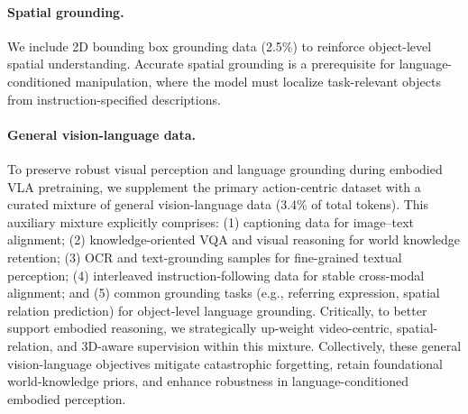 \paragraph{Spatial grounding.}
We include 2D bounding box grounding data (2.5\%) to reinforce object-level
spatial understanding. Accurate spatial grounding is a prerequisite for
language-conditioned manipulation, where the model must localize task-relevant
objects from instruction-specified descriptions.

\paragraph{General vision-language data.}
To preserve robust visual perception and language grounding during embodied VLA pretraining, we supplement the primary action-centric dataset with a curated mixture of general vision-language data (3.4\% of total tokens). This auxiliary mixture explicitly comprises: (1) captioning data for image--text alignment; (2) knowledge-oriented VQA and visual reasoning for world knowledge retention; (3) OCR and text-grounding samples for fine-grained textual perception; (4) interleaved instruction-following data for stable cross-modal alignment; and (5) common grounding tasks (e.g., referring expression, spatial relation prediction) for object-level language grounding. 
Critically, to better support embodied reasoning, we strategically up-weight video-centric, spatial-relation, and 3D-aware supervision within this mixture. Collectively, these general vision-language objectives mitigate catastrophic forgetting, retain foundational world-knowledge priors, and enhance robustness in language-conditioned embodied perception.
